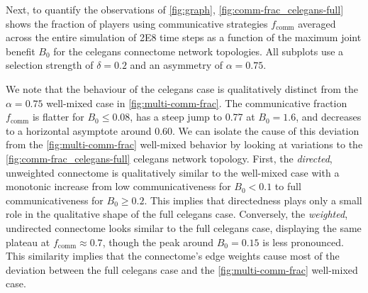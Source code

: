 \documentclass[pdflatex,lineno,referee,sn-nature]{sn-jnl}
\begin{document}
Next, to quantify the observations of \cref{fig:graph},
\cref{fig:comm-frac_celegans-full} shows the fraction of players
using communicative strategies $f_{\text{comm}}$ averaged across
the entire simulation of \num{2E8} time steps as a function
of the maximum joint benefit $B_0$
for the \gls{celegans} connectome network topologies.
All subplots use a selection strength of $\delta=0.2$
and an asymmetry of $\alpha=0.75$.

We note that the behaviour
of the  \gls{celegans} case
is qualitatively distinct
from the $\alpha = 0.75$ well-mixed case in \cref{fig:multi-comm-frac}.
The communicative fraction $f_{\text{comm}}$
is flatter for $B_0 \le 0.08$,
has a steep jump to \num{0.77} at $B_0 = 1.6$,
and decreases to a horizontal asymptote around \num{0.60}.
We can isolate the cause of this deviation
from the \cref{fig:multi-comm-frac} well-mixed
behavior by looking at variations to the \cref{fig:comm-frac_celegans-full}
\gls{celegans} network topology.
First, the 
\emph{directed}, unweighted connectome
is qualitatively similar to the
well-mixed case with a monotonic increase
from low communicativeness for $B_0 < 0.1$
to full communicativeness for $B_0 \ge 0.2$.
This implies that directedness
plays only a small role in the qualitative shape
of the  full \gls{celegans} case.
Conversely,
the 
\emph{weighted}, undirected connectome
looks similar to the 
full \gls{celegans} case,
displaying the same plateau at $f_{\text{comm}} \approx 0.7$,
though the peak around $B_0 = 0.15$ is less pronounced.
This similarity implies that the connectome's edge weights
cause most of the deviation
between the  full \gls{celegans}
case and the \cref{fig:multi-comm-frac} well-mixed case.
\end{document}
